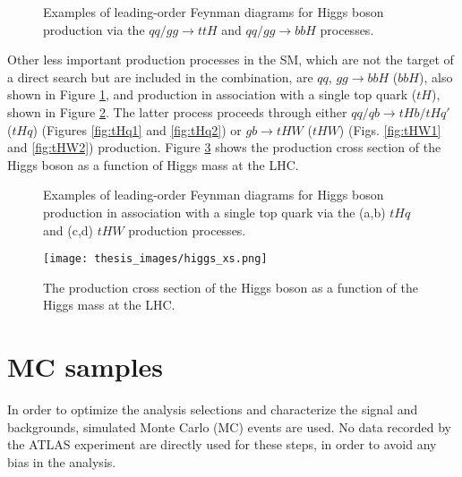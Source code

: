 \documentclass[a4paper, oneside, 11pt, openright]{book}
\begin{document}
 			\begin{figure}
 				\centering
 				\hspace{.2cm}
 				\hspace{.2cm}				
 				\caption{Examples of leading-order Feynman diagrams for Higgs boson production via the $qq/gg\to ttH$ and $qq/gg\to bbH$ processes.}
 				\label{fig:prod3}
 			\end{figure}
 			Other less important production processes in the SM, which are not the target of a direct search but are included in the combination, are $qq$, $gg\to bbH$ ($bbH$), also shown in Figure \ref{fig:prod3}, and production in association with a single top quark ($tH$), shown in Figure \ref{fig:prod4}. The latter process proceeds through either $qq/qb\to tHb/tHq'$ ($tHq$) (Figures \ref{fig:tHq1} and \ref{fig:tHq2}) or $gb\to tHW$ ($tHW$) (Figs. \ref{fig:tHW1} and \ref{fig:tHW2}) production. Figure \ref{fig:Higgs_xs} shows the production cross section of the Higgs boson as a function of Higgs mass at the	LHC.
 			\begin{figure}
 				\centering
 				\hspace{.1cm}
 				\hspace{.1cm}				
 				\hspace{.1cm}
 				\caption{Examples of leading-order Feynman diagrams for Higgs boson production in association with a single top quark via the (a,b) $tHq$ and (c,d) $tHW$ production processes.}
 				\label{fig:prod4}
 			\end{figure}
 			\begin{figure}
 				\centering
 				\texttt{[image: thesis\_images/higgs\_xs.png]}
 				\caption{The production cross section of the Higgs boson as a function of the Higgs mass at the LHC.}
 				\label{fig:Higgs_xs}
 			\end{figure}
 	
 		\section{MC samples}
			In order to optimize the analysis selections and characterize the signal and backgrounds, simulated Monte Carlo (MC) events are used. No data recorded by the ATLAS experiment are directly used for these steps, in order to avoid any bias in the analysis. 
			
\end{document}
